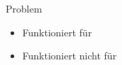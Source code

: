 %
%

\begin{frame}{Problem}
\begin{itemize}
 \item Funktioniert für \host
 \item Funktioniert {\Huge nicht} für \targetS
\end{itemize}
\end{frame}
